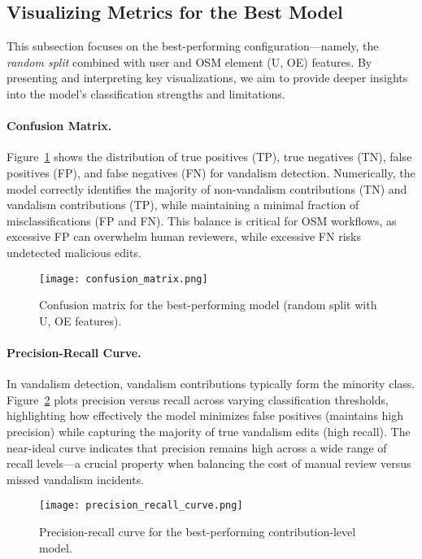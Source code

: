 \documentclass[
    13pt, %
    a4paper, %
    DIV14, %
    listof=totoc, %
    bibliography=totoc, %
    index=totoc, %
    headsepline
]{scrreprt}
\begin{document}
\subsection{Visualizing Metrics for the Best Model}
\label{sec:visualizing_metrics}

This subsection focuses on the best-performing configuration—namely, the \emph{random split} combined with user and OSM element (U, OE) features. By presenting and interpreting key visualizations, we aim to provide deeper insights into the model’s classification strengths and limitations.

\paragraph{Confusion Matrix.}
Figure~\ref{fig:confusion_matrix} shows the distribution of true positives (TP), true negatives (TN), false positives (FP), and false negatives (FN) for vandalism detection. Numerically, the model correctly identifies the majority of non-vandalism contributions (TN) and vandalism contributions (TP), while maintaining a minimal fraction of misclassifications (FP and FN). This balance is critical for OSM workflows, as excessive FP can overwhelm human reviewers, while excessive FN risks undetected malicious edits.

\begin{figure}[H]
    \centering
    \texttt{[image: confusion\_matrix.png]}
    \caption{Confusion matrix for the best-performing model (random split with U, OE features).}
    \label{fig:confusion_matrix}
\end{figure}

\paragraph{Precision-Recall Curve.}
In vandalism detection, vandalism contributions typically form the minority class. Figure~\ref{fig:precision_recall} plots precision versus recall across varying classification thresholds, highlighting how effectively the model minimizes false positives (maintains high precision) while capturing the majority of true vandalism edits (high recall). The near-ideal curve indicates that precision remains high across a wide range of recall levels—a crucial property when balancing the cost of manual review versus missed vandalism incidents.

\begin{figure}[H]
    \centering
    \texttt{[image: precision\_recall\_curve.png]}
    \caption{Precision-recall curve for the best-performing contribution-level model.}
    \label{fig:precision_recall}
\end{figure}
\end{document}

